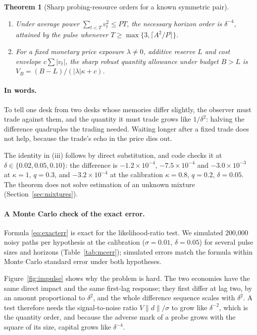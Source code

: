 \documentclass[12pt]{article}
\newtheorem{theorem}{Theorem}[section]
\theoremstyle{definition}
\theoremstyle{remark}
\begin{document}
\begin{theorem}[Sharp probing-resource orders for a known symmetric pair]
\begin{enumerate}[label=(\roman*)]
\begin{equation}\label{eq:pulse}
A=\frac{2\sigma\Phi^{-1}(1-\alpha)}{\kappa^2q\delta^2}
\end{equation}
and the third observation achieve error exactly $\alpha$. The necessary and sufficient quantity order is $\delta^{-2}$.
\item Under average power $\sum_{t<T}v_t^2\le PT$, the necessary horizon order is $\delta^{-4}$, attained by the pulse whenever $T\ge\max\{3,\lceil A^2/P\rceil\}$.
\item For a fixed monetary price exposure $\lambda\neq0$, additive reserve $L$ and cost envelope $c\sum|v_t|$, the sharp robust quantity allowance under budget $B>L$ is $V_B=(B-L)/(|\lambda|\kappa+c)$.
\end{enumerate}
\end{theorem}

\paragraph{In words.} To tell one desk from two desks whose memories differ slightly, the observer must trade against them, and the quantity it must trade grows like $1/\delta^2$: halving the difference quadruples the trading needed. Waiting longer after a fixed trade does not help, because the trade's echo in the price dies out.


The identity in (iii) follows by direct substitution, and code checks it at $\delta\in\{0.02,0.05,0.10\}$: the difference is $-1.2\times10^{-4}$, $-7.5\times10^{-4}$ and $-3.0\times10^{-3}$ at $\kappa=1$, $q=0.3$, and $-3.2\times10^{-4}$ at the calibration $\kappa=0.8$, $q=0.2$, $\delta=0.05$. The theorem does not solve estimation of an unknown mixture (Section~\ref{sec:mixtures}).



\paragraph{A Monte Carlo check of the exact error.} Formula \eqref{eq:exacterr} is exact for the likelihood-ratio test. We simulated 200,000 noisy paths per hypothesis at the calibration ($\sigma=0.01$, $\delta=0.05$) for several pulse sizes and horizons (Table~\ref{tab:mcerr}); simulated errors match the formula within Monte Carlo standard error under both hypotheses.



Figure~\ref{fig:impulse} shows why the problem is hard. The two economies have the same direct impact and the same first-lag response; they first differ at lag two, by an amount proportional to $\delta^2$, and the whole difference sequence scales with $\delta^2$. A test therefore needs the signal-to-noise ratio $V\|d\|/\sigma$ to grow like $\delta^{-2}$, which is the quantity order, and because the adverse mark of a probe grows with the square of its size, capital grows like $\delta^{-4}$.
\end{document}

